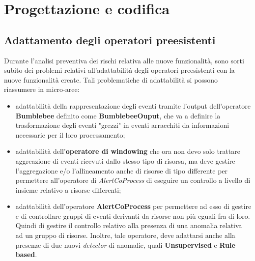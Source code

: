 
\chapter{Progettazione e codifica}
\label{cap:progettazione-codifica}


\section{Adattamento degli operatori preesistenti}
Durante l'analisi preventiva dei rischi relativa alle nuove funzionalità, sono sorti subito dei problemi relativi all'adattabilità degli operatori preesistenti con la nuove funzionalità create. Tali problematiche di adattabilità si possono riassumere in micro-aree:

\begin{itemize}
	\item{adattabilità della rappresentazione degli eventi tramite l'output dell'operatore \textbf{Bumblebee} definito come \textbf{BumblebeeOuput}, che va a definire la trasformazione degli eventi "grezzi" in eventi arracchiti da informazioni necessarie per il loro processamento;}
	\item{adattabilità dell'\textbf{operatore di windowing} che ora non devo solo trattare aggreazione di eventi ricevuti dallo stesso tipo di risorsa, ma deve gestire l'aggregazione e/o l'allineamento anche di risorse di tipo differente per permettere all'operatore di \textit{AlertCoProcess} di eseguire un controllo a livello di insieme relativo a risorse differenti;}
	\item{adattabilità dell'operatore \textbf{AlertCoProcess} per permettere ad esso di gestire e di controllare gruppi di eventi derivanti da risorse non più eguali fra di loro. Quindi di gestire il controllo relativo alla presenza di una anomalia relativa ad un gruppo di risorse. Inoltre, tale operatore, deve adattarsi anche alla presenze di due nuovi \textit{detector} di anomalie, quali \textbf{Unsupervised} e \textbf{Rule based}.}
\end{itemize}
	
